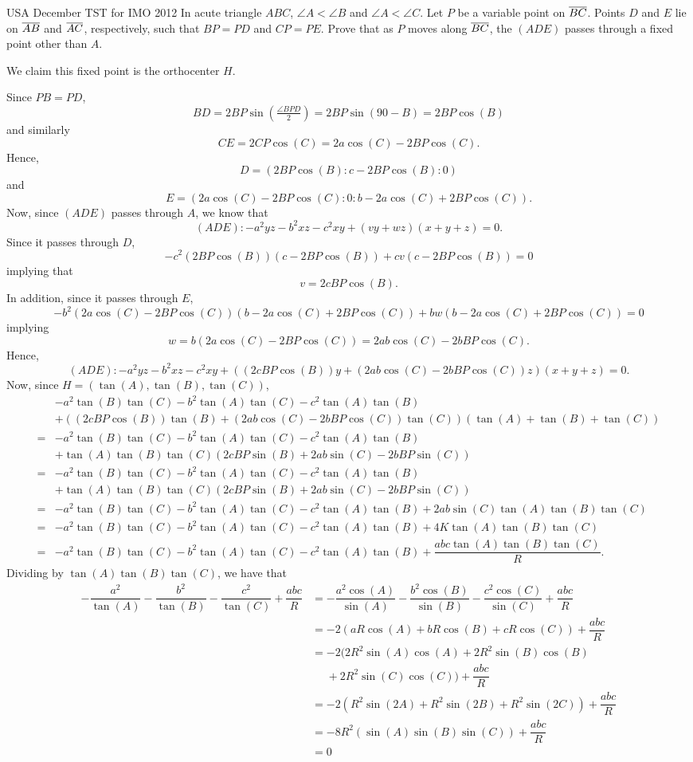 \documentclass{article}
\begin{document}
\begin{problem}[7.43]{USA December TST for IMO 2012}
In acute triangle $ABC$, $\angle A < \angle B$ and $\angle A < \angle C$. Let $P$ be a variable point on $\overline{BC}$. Points $D$ and $E$ lie on $\overline{AB}$ and $\overline{AC}$, respectively, such that $BP = PD$ and $CP = PE$. Prove that as $P$ moves along $\overline{BC}$, the $(ADE)$ passes through a fixed point other than $A$.
\end{problem}

We claim this fixed point is the orthocenter $H$.

Since $PB = PD$, \[BD = 2BP\sin\left(\tfrac{\angle BPD}{2}\right) = 2BP\sin(90-B) = 2BP\cos(B)\] and similarly \[CE = 2CP\cos(C) = 2a\cos(C)-2BP\cos(C).\] Hence, \[D = (2BP\cos(B): c-2BP\cos(B) : 0)\] and \[E = (2a\cos(C)-2BP\cos(C) : 0 : b-2a\cos(C)+2BP\cos(C)).\] Now, since $(ADE)$ passes through $A$, we know that \[(ADE) : -a^2yz-b^2xz-c^2xy+(vy+wz)(x+y+z) = 0.\] Since it passes through $D$, \[-c^2(2BP\cos(B))(c-2BP\cos(B))+cv(c-2BP\cos(B)) = 0\] implying that \[v = 2cBP\cos(B).\] In addition, since it passes through $E$, \[-b^2(2a\cos(C)-2BP\cos(C))(b-2a\cos(C)+2BP\cos(C))+bw(b-2a\cos(C)+2BP\cos(C)) = 0\] implying \[w = b(2a\cos(C)-2BP\cos(C)) = 2ab\cos(C)-2bBP\cos(C).\] Hence, \[(ADE) : -a^2yz-b^2xz-c^2xy+((2cBP\cos(B))y+(2ab\cos(C)-2bBP\cos(C))z)(x+y+z) = 0.\] Now, since $H = (\tan(A), \tan(B), \tan(C))$,
\begin{align*}
&-a^2\tan(B)\tan(C)-b^2\tan(A)\tan(C)-c^2\tan(A)\tan(B) \\
&+ ((2cBP\cos(B))\tan(B)+(2ab\cos(C)-2bBP\cos(C))\tan(C))(\tan(A)+\tan(B)+\tan(C)) \\
= &-a^2\tan(B)\tan(C)-b^2\tan(A)\tan(C)-c^2\tan(A)\tan(B) \\
&+\tan(A)\tan(B)\tan(C)(2cBP\sin(B)+2ab\sin(C)-2bBP\sin(C)) \\
= &-a^2\tan(B)\tan(C)-b^2\tan(A)\tan(C)-c^2\tan(A)\tan(B) \\
&+\tan(A)\tan(B)\tan(C)(2cBP\sin(B)+2ab\sin(C)-2bBP\sin(C)) \\
= &-a^2\tan(B)\tan(C)-b^2\tan(A)\tan(C)-c^2\tan(A)\tan(B)+2ab\sin(C)\tan(A)\tan(B)\tan(C) \\
= &-a^2\tan(B)\tan(C)-b^2\tan(A)\tan(C)-c^2\tan(A)\tan(B)+4K\tan(A)\tan(B)\tan(C) \\
= &-a^2\tan(B)\tan(C)-b^2\tan(A)\tan(C)-c^2\tan(A)\tan(B)+\dfrac{abc\tan(A)\tan(B)\tan(C)}{R}.
\end{align*}
Dividing by $\tan(A)\tan(B)\tan(C)$, we have that
\begin{align*}
-\dfrac{a^2}{\tan(A)}-\dfrac{b^2}{\tan(B)}-\dfrac{c^2}{\tan(C)}+\dfrac{abc}{R} &= -\dfrac{a^2\cos(A)}{\sin(A)}-\dfrac{b^2\cos(B)}{\sin(B)}-\dfrac{c^2\cos(C)}{\sin(C)}+\dfrac{abc}{R} \\
&= -2(aR\cos(A)+bR\cos(B)+cR\cos(C))+\dfrac{abc}{R} \\
&= -2(2R^2\sin(A)\cos(A)+2R^2\sin(B)\cos(B) \\
&\phantom{=} +2R^2\sin(C)\cos(C))+\dfrac{abc}{R} \\
&= -2(R^2\sin(2A)+R^2\sin(2B)+R^2\sin(2C))+\dfrac{abc}{R} \\
&= -8R^2(\sin(A)\sin(B)\sin(C))+\dfrac{abc}{R} \\
&= 0
\end{align*}
\end{document}
